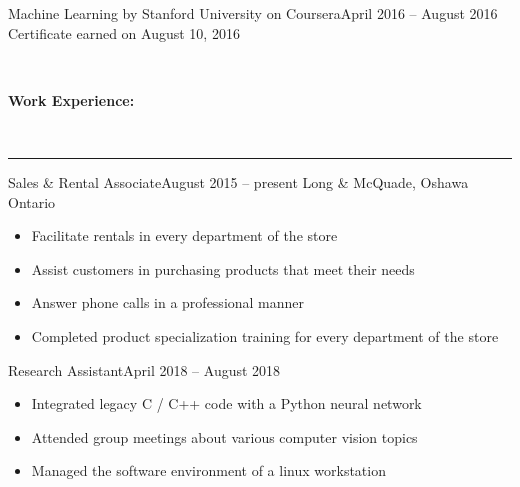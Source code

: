 \documentclass[]{article}
\makeatletter
\newcommand{\heading}[1]
{\begin{large}\textbf{#1}\end{large}\\%
 \rule[1.2ex]{\linewidth}{0.4pt}}
\newenvironment{*subsection}[2]
{
\begin{tabu} to \linewidth {@{}X[l] r}
  \textbf{#1} &
  \textbf{#2}
\end{tabu}
}
{
  \vspace{3mm}
}
\makeatother
\begin{document}
\begin{*subsection}{Machine Learning by Stanford University on Coursera}{April 2016 -- August 2016}%
  Certificate earned on August 10, 2016
\end{*subsection}
\\
\heading{Work Experience:}
\begin{*subsection}{Sales \& Rental Associate}{August 2015 -- present}
  Long \& McQuade, Oshawa Ontario
  \begin{itemize}
    \item Facilitate rentals in every department of the store
    \item Assist customers in purchasing products that meet their needs
    \item Answer phone calls in a professional manner
    \item Completed product specialization training for every department of the store
  \end{itemize}
\end{*subsection}
%
\begin{*subsection}{Research Assistant}{April 2018 -- August 2018}
  \begin{itemize}
    \item Integrated legacy C / C++ code with a Python neural network
    \item Attended group meetings about various computer vision topics
    \item Managed the software environment of a linux workstation
  \end{itemize}
\end{*subsection}
%
\end{document}
